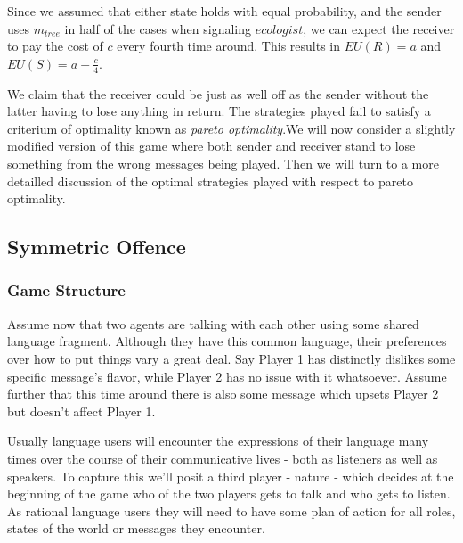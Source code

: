 \documentclass{article}
\begin{document}
Since we assumed that either state holds with equal probability, and the sender uses $m_{tree}$ in half of the cases when signaling $ecologist$, we can expect the receiver to pay the cost of $c$ every fourth time around. This results in $EU(R)=a$ and $EU(S)=a-\tfrac{c}{4}$.

We claim that the receiver could be just as well off as the sender without the latter having to lose anything in return. The strategies played fail to satisfy a criterium of optimality known as \textit{pareto optimality}.We will now consider a slightly modified version of this game where both sender and receiver stand to lose something from the wrong messages being played. Then we will turn to a more detailled discussion of the optimal strategies played with respect to pareto optimality.

\subsection{Symmetric Offence}
\subsubsection{Game Structure}
Assume now that two agents are talking with each other using some shared language fragment. Although they have this common language, their preferences over how to put things vary a great deal. Say Player 1 has distinctly dislikes some specific message's flavor, while Player 2 has no issue with it whatsoever. Assume further that this time around there is also some message which upsets Player 2 but doesn't affect Player 1.

Usually language users will encounter the expressions of their language many times over the course of their communicative lives - both as listeners as well as speakers. To capture this we'll posit a third player - nature - which decides at the beginning of the game who of the two players gets to talk and who gets to listen. As rational language users they will need to have some plan of action for all roles, states of the world or messages they encounter.
\end{document}
